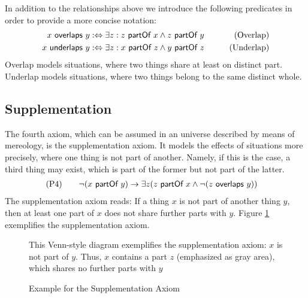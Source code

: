 In addition to the relationships above we introduce the following predicates in order to provide a more concise notation:
\begin{align}
x ~\textsf{overlaps}~ y
&:\Leftrightarrow
\exists z : z ~\textsf{partOf}~ x \wedge z ~\textsf{partOf}~ y
&\qquad \text{(Overlap)}
\\
x ~\textsf{underlaps}~ y
&:\Leftrightarrow
\exists z : x ~\textsf{partOf}~ z \wedge y ~\textsf{partOf}~ z
&\qquad \text{(Underlap)}
\end{align}
Overlap models situations, where two things share at least on distinct part.
Underlap models situations, where two things belong to the same distinct whole.

\subsection{Supplementation}
\label{subsection:Supplementation}
The fourth axiom, which can be assumed in an universe described by means of mereology, is the supplementation axiom.
It models the effects of situations more precisely, where one thing is not part of another.
Namely, if this is the case, a third thing may exist, which is part of the former but not part of the latter.
\begin{align}
&\text{(P4)}
\qquad
\neg(x ~\textsf{partOf}~ y) \rightarrow \exists z (z ~\textsf{partOf}~ x \wedge \neg(z ~\textsf{overlaps}~ y))
\end{align}
The supplementation axiom reads: If a thing $x$ is not part of another thing $y$, then at least one part of $x$ does not share further parts with $y$.
Figure \ref{fig:SupplementaitonAxiomExample} exemplifies the supplementation axiom.

\begin{figure}[h!]
\begin{center}
\end{center}
{
\scriptsize 
This Venn-style diagram exemplifies the supplementation axiom:
$x$ is not part of $y$.
Thus, $x$ contains a part $z$ (emphasized as gray area), which shares no further parts with $y$
}
\caption{Example for the Supplementation Axiom}
\label{fig:SupplementaitonAxiomExample}
\end{figure}

